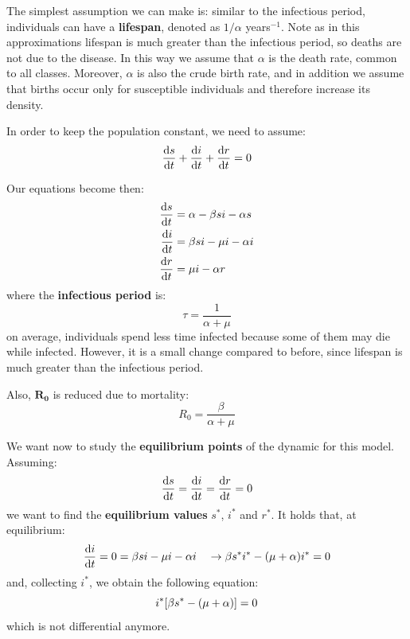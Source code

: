 \documentclass[../main/main.tex]{subfiles}
\begin{document}
The simplest assumption we can make is: similar to the infectious period, individuals can have a \textbf{lifespan}, denoted as \( 1/\alpha  \) years$^{-1}$. Note as in this approximations lifespan is much greater than the infectious period, so deaths are not due to the disease. In this way we assume that \( \alpha  \) is the death rate, common to all classes. Moreover, \( \alpha  \) is also the crude birth rate, and in addition we assume that births occur only for susceptible individuals and therefore increase its density.

In order to keep the population constant, we need to assume:
\begin{equation}
  \dv{s}{t} + \dv{i}{t} + \dv{r}{t} = 0
\end{equation}

Our equations become then:
\begin{equation}
\begin{split}
  \dv{s}{t} &= \alpha - \beta s i - \alpha s  \\
  \dv{i}{t} &= \beta s i - \mu i - \alpha i \\
  \dv{r}{t} &= \mu i - \alpha r
\end{split}
\end{equation}
where the \textbf{infectious period} is:
\begin{equation}
  \tau = \frac{1}{\alpha + \mu }
\end{equation}
on average, individuals spend less time infected because some of them may die while infected. However, it is a small change compared to before, since lifespan is much greater than the infectious period.

Also, \( \mathbf{R_0} \) is reduced due to mortality:
\begin{equation}
  R_0 = \frac{\beta }{\alpha + \mu }
\end{equation}

We want now to study the \textbf{equilibrium points} of the dynamic for this model. Assuming:
\begin{equation*}
  \dv{s}{t} = \dv{i}{t} = \dv{r}{t} = 0
\end{equation*}
we want to find the \textbf{equilibrium values}  \( s^* \), \( i^* \) and \( r^* \).
It holds that, at equilibrium:
\begin{equation*}
  \dv{i}{t} = 0 = \beta s i - \mu i - \alpha i \quad \rightarrow   \beta s^* i^* - (\mu + \alpha ) i^* = 0
\end{equation*}
and, collecting $i^*$, we obtain the following equation:
\begin{equation}
  i^* \qty[\beta s^* - (\mu + \alpha )] = 0
\end{equation}
which is not differential anymore.
\end{document}
